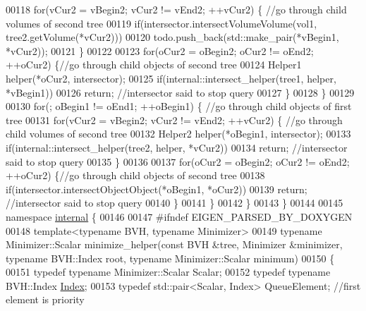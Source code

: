 \begin{DoxyCode}
00118       \textcolor{keywordflow}{for}(vCur2 = vBegin2; vCur2 != vEnd2; ++vCur2) \{ \textcolor{comment}{//go through child volumes of second tree}
00119         \textcolor{keywordflow}{if}(intersector.intersectVolumeVolume(vol1, tree2.getVolume(*vCur2)))
00120           todo.push\_back(std::make\_pair(*vBegin1, *vCur2));
00121       \}
00122 
00123       \textcolor{keywordflow}{for}(oCur2 = oBegin2; oCur2 != oEnd2; ++oCur2) \{\textcolor{comment}{//go through child objects of second tree}
00124         Helper1 helper(*oCur2, intersector);
00125         \textcolor{keywordflow}{if}(internal::intersect\_helper(tree1, helper, *vBegin1))
00126           \textcolor{keywordflow}{return}; \textcolor{comment}{//intersector said to stop query}
00127       \}
00128     \}
00129 
00130     \textcolor{keywordflow}{for}(; oBegin1 != oEnd1; ++oBegin1) \{ \textcolor{comment}{//go through child objects of first tree}
00131       \textcolor{keywordflow}{for}(vCur2 = vBegin2; vCur2 != vEnd2; ++vCur2) \{ \textcolor{comment}{//go through child volumes of second tree}
00132         Helper2 helper(*oBegin1, intersector);
00133         \textcolor{keywordflow}{if}(internal::intersect\_helper(tree2, helper, *vCur2))
00134           \textcolor{keywordflow}{return}; \textcolor{comment}{//intersector said to stop query}
00135       \}
00136 
00137       \textcolor{keywordflow}{for}(oCur2 = oBegin2; oCur2 != oEnd2; ++oCur2) \{\textcolor{comment}{//go through child objects of second tree}
00138         \textcolor{keywordflow}{if}(intersector.intersectObjectObject(*oBegin1, *oCur2))
00139           \textcolor{keywordflow}{return}; \textcolor{comment}{//intersector said to stop query}
00140       \}
00141     \}
00142   \}
00143 \}
00144 
00145 \textcolor{keyword}{namespace }\hyperlink{namespaceinternal}{internal} \{
00146 
00147 \textcolor{preprocessor}{#ifndef EIGEN\_PARSED\_BY\_DOXYGEN}
00148 \textcolor{keyword}{template}<\textcolor{keyword}{typename} BVH, \textcolor{keyword}{typename} Minimizer>
00149 \textcolor{keyword}{typename} Minimizer::Scalar minimize\_helper(\textcolor{keyword}{const} BVH &tree, Minimizer &minimizer, \textcolor{keyword}{typename} BVH::Index root,
       \textcolor{keyword}{typename} Minimizer::Scalar minimum)
00150 \{
00151   \textcolor{keyword}{typedef} \textcolor{keyword}{typename} Minimizer::Scalar Scalar;
00152   \textcolor{keyword}{typedef} \textcolor{keyword}{typename} BVH::Index \hyperlink{namespace_eigen_a62e77e0933482dafde8fe197d9a2cfde}{Index};
00153   \textcolor{keyword}{typedef} std::pair<Scalar, Index> QueueElement; \textcolor{comment}{//first element is priority}

\end{DoxyCode}
